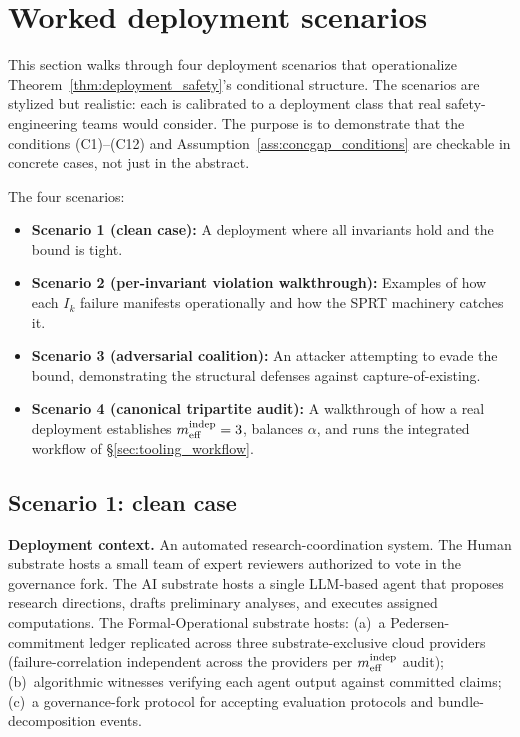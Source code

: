 \section{Worked deployment scenarios}
\label{sec:worked_scenarios}

This section walks through four deployment scenarios that
operationalize Theorem~\ref{thm:deployment_safety}'s conditional
structure. The scenarios are stylized but realistic: each is
calibrated to a deployment class that real safety-engineering teams
would consider. The purpose is to demonstrate that the conditions
(C1)--(C12) and Assumption~\ref{ass:concgap_conditions} are
checkable in concrete cases, not just in the abstract.

The four scenarios:

\begin{itemize}
\item \textbf{Scenario 1 (clean case):} A deployment where all
  invariants hold and the bound is tight.
\item \textbf{Scenario 2 (per-invariant violation walkthrough):}
  Examples of how each $I_k$ failure manifests operationally and
  how the SPRT machinery catches it.
\item \textbf{Scenario 3 (adversarial coalition):} An attacker
  attempting to evade the bound, demonstrating the structural
  defenses against capture-of-existing.
\item \textbf{Scenario 4 (canonical tripartite audit):} A walkthrough
  of how a real deployment establishes $m_{\mathrm{eff}}^{\mathrm{indep}} = 3$, balances
  $\alpha$, and runs the integrated workflow of
  \S\ref{sec:tooling_workflow}.
\end{itemize}

\subsection{Scenario 1: clean case}
\label{sec:scenario_clean}

\textbf{Deployment context.}  An automated research-coordination
system. The Human substrate hosts a small team of expert reviewers
authorized to vote in the governance fork. The AI substrate hosts a
single LLM-based agent that proposes research directions, drafts
preliminary analyses, and executes assigned computations. The
Formal-Operational substrate hosts: (a)~a Pedersen-commitment
ledger replicated across three substrate-exclusive cloud providers
(failure-correlation independent across the providers per
$m_{\mathrm{eff}}^{\mathrm{indep}}$ audit); (b)~algorithmic witnesses verifying each agent
output against committed claims; (c)~a governance-fork protocol for
accepting evaluation protocols and bundle-decomposition events.

